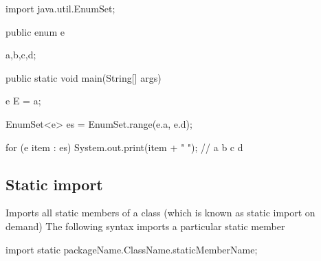 \documentclass{report}
\begin{document}
    \bigbreak \noindent 
    \begin{javacode}
        import java.util.EnumSet;

        public enum e{
            a,b,c,d;

            public static void main(String[] args) {
                e E = a;

                EnumSet<e> es = EnumSet.range(e.a, e.d);

                for (e item : es) System.out.print(item + " ");
                // a b c d
            }
        }
    \end{javacode}

    \bigbreak \noindent 
    \subsection{Static import}
    \bigbreak \noindent 
    Imports all static members of a class (which is known as static import on demand)
    \bigbreak \noindent 
    The following syntax imports a particular static member
    \bigbreak \noindent 
    \begin{javacode}
    import static packageName.ClassName.staticMemberName;
    \end{javacode}
\end{document}
